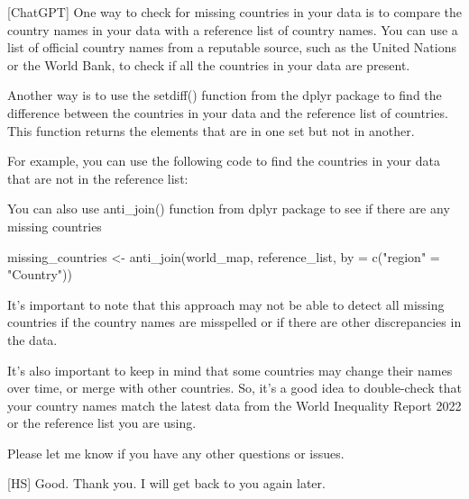 \documentclass[
]{bxjsbook}
\newenvironment{Shaded}{\begin{snugshade}}{\end{snugshade}}
\newcommand{\AttributeTok}[1]{\textcolor[rgb]{0.77,0.63,0.00}{#1}}
\newcommand{\FunctionTok}[1]{\textcolor[rgb]{0.00,0.00,0.00}{#1}}
\newcommand{\NormalTok}[1]{#1}
\newcommand{\OtherTok}[1]{\textcolor[rgb]{0.56,0.35,0.01}{#1}}
\newcommand{\SpecialCharTok}[1]{\textcolor[rgb]{0.00,0.00,0.00}{#1}}
\newcommand{\StringTok}[1]{\textcolor[rgb]{0.31,0.60,0.02}{#1}}
\theoremstyle{definition}
\theoremstyle{definition}
\theoremstyle{definition}
\theoremstyle{definition}
\theoremstyle{remark}
\begin{document}
{[}ChatGPT{]} One way to check for missing countries in your data is to compare the country names in your data with a reference list of country names. You can use a list of official country names from a reputable source, such as the United Nations or the World Bank, to check if all the countries in your data are present.

Another way is to use the setdiff() function from the dplyr package to find the difference between the countries in your data and the reference list of countries. This function returns the elements that are in one set but not in another.

For example, you can use the following code to find the countries in your data that are not in the reference list:

\begin{Shaded}
\end{Shaded}

You can also use anti\_join() function from dplyr package to see if there are any missing countries

\begin{Shaded}
\begin{Highlighting}[]
\NormalTok{missing\_countries }\OtherTok{\textless{}{-}} \FunctionTok{anti\_join}\NormalTok{(world\_map, reference\_list, }\AttributeTok{by =} \FunctionTok{c}\NormalTok{(}\StringTok{"region"} \OtherTok{=} \StringTok{"Country"}\NormalTok{))}
\end{Highlighting}
\end{Shaded}

It's important to note that this approach may not be able to detect all missing countries if the country names are misspelled or if there are other discrepancies in the data.

It's also important to keep in mind that some countries may change their names over time, or merge with other countries. So, it's a good idea to double-check that your country names match the latest data from the World Inequality Report 2022 or the reference list you are using.

Please let me know if you have any other questions or issues.

{[}HS{]} Good. Thank you. I will get back to you again later.
\end{document}
